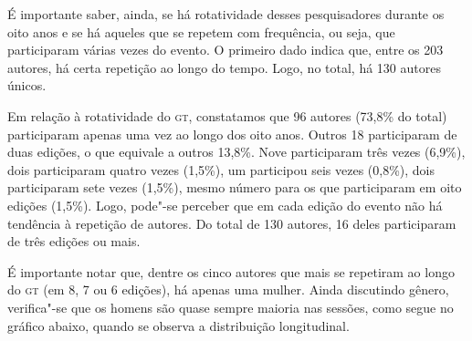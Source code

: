 {É importante saber, ainda, se há rotatividade desses pesquisadores
durante os oito anos e se há aqueles que se repetem com frequência,
ou seja, que participaram várias vezes do evento. O primeiro dado indica
que, entre os 203 autores, há certa repetição ao longo do tempo.
Logo, no total, há 130 autores únicos. 

Em relação à rotatividade do \textsc{gt}, constatamos que
96 autores (73,8\% do total) participaram
apenas uma vez ao longo dos oito anos. Outros 18 participaram de duas
edições, o que equivale a outros 13,8\%. Nove participaram três vezes (6,9\%), dois participaram quatro vezes (1,5\%), um participou seis vezes (0,8\%), dois participaram sete vezes (1,5\%), mesmo número para os que participaram em oito edições (1,5\%).
Logo, pode"-se perceber que em
cada edição do evento não há tendência à repetição de autores. Do
total de 130 autores, 16 deles participaram de três edições ou
mais.

É importante notar que, dentre os cinco autores que mais se
repetiram ao longo do \textsc{gt} (em 8, 7 ou 6 edições), há apenas uma mulher.
Ainda discutindo gênero, verifica"-se que os homens são quase sempre
maioria nas sessões, como segue no gráfico abaixo, quando se observa a
distribuição longitudinal.


}
